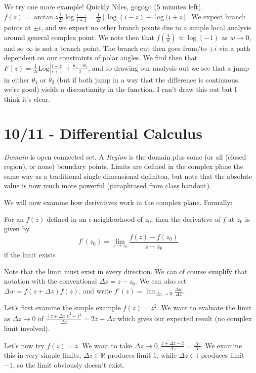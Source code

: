 \documentclass[10pt]{report}
\newcommand{\abs}[1]{\left|#1\right|}
\newcommand{\Log}[0]{\mathrm{Log} }
\begin{document}
We try one more example! Quickly Niles, gogogo (5 minutes left). $f(z)=\arctan z \frac{1}{2i}\log \frac{i-z}{i+z}=\frac{1}{2i}\left[ \log (i-z) - \log(i+z \right]$. We expect branch points at $\pm i$, and we expect no other branch points due to a simple local analysis around general complex point. We note then that $f\left( \frac{1}{w} \right) \approx \log (-1)$ as $w \to 0$, and so $\infty$ is not a branch point. The branch cut then goes from/to $\pm i$ via a path dependent on our constraints of polar angles. We find then that $F(z) = \frac{1}{2i}\Log \abs{\frac{i-z}{i+z}} + \frac{\theta_1-\theta_2}{2}$, and so drawing our analysis out we see that a jump in either $\theta_1$ or $\theta_2$ (but if both jump in a way that the difference is continuous, we're good) yields a discontinuity in the function. I can't draw this out but I think it's clear.

\chapter{10/11 - Differential Calculus}

\emph{Domain} is open connected set. A \emph{Region} is the domain plus some (or all (closed region), or none) boundary points. Limits are defined in the complex plane the same way as a traditional single dimensional definiton, but note that the absolute value is now much more powerful (paraphrased from class handout). 

We will now examine how derivatives work in the complex plane. Formally:
\begin{center}
	For an $f(z)$ defined in an $\epsilon$-neighborhood of $z_0$, then the derivative of $f$ at $z_0$ is given by
	$$f'(z_0) = \lim_{z \to z_0} \frac{f(z)-f(z_0)}{z-z_0}$$
	if the limit exists
\end{center}

Note that the limit must exist in every direction. We can of course simplify that notation with the conventional $\Delta z = z-z_0$. We can also set $\Delta w = f(z+\Delta z)  f(z)$, and write $f'(z) = \lim_{\Delta z \to 0}\frac{\Delta w}{\Delta z}$. 

Let's first examine the simple example $f(z)=z^2$. We want to evaluate the limit as $\Delta z \to 0$ of $\frac{(z+\Delta z)^2 - z^2}{\Delta z} = 2z + \Delta z$ which gives our expected result (no complex limit involved).

Let's now try $f(z) = \bar{z}$. We want to take $\Delta z\to 0, \frac{\bar{z+\Delta z}-\bar{z}}{\Delta z} = \frac{\bar{\Delta z}}{\Delta z}$. We examine this in very simple limits, $\Delta z \in \mathbb{R}$ produces limit $1$, while $\Delta z \in \mathbb{I}$ produces limit $-1$, so the limit obviously doesn't exist. 
\end{document}
